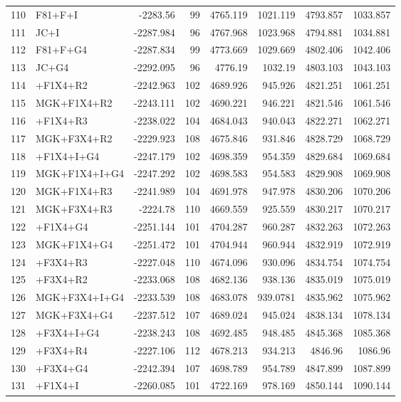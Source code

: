 \begin{longtable}{clrrrrrr}
	110 & F81+F+I & -2283.56 & 99 & 4765.119 & 1021.119 & 4793.857 & 1033.857 \\ 
	111 & JC+I & -2287.984 & 96 & 4767.968 & 1023.968 & 4794.881 & 1034.881 \\ 
	112 & F81+F+G4 & -2287.834 & 99 & 4773.669 & 1029.669 & 4802.406 & 1042.406 \\ 
	113 & JC+G4 & -2292.095 & 96 & 4776.19 & 1032.19 & 4803.103 & 1043.103 \\ 
	114 & \gy+F1X4+R2 & -2242.963 & 102 & 4689.926 & 945.926 & 4821.251 & 1061.251 \\ 
	115 & MGK+F1X4+R2 & -2243.111 & 102 & 4690.221 & 946.221 & 4821.546 & 1061.546 \\ 
	116 & \gy+F1X4+R3 & -2238.022 & 104 & 4684.043 & 940.043 & 4822.271 & 1062.271 \\ 
	117 & MGK+F3X4+R2 & -2229.923 & 108 & 4675.846 & 931.846 & 4828.729 & 1068.729 \\ 
	118 & \gy+F1X4+I+G4 & -2247.179 & 102 & 4698.359 & 954.359 & 4829.684 & 1069.684 \\ 
	119 & MGK+F1X4+I+G4 & -2247.292 & 102 & 4698.583 & 954.583 & 4829.908 & 1069.908 \\ 
	120 & MGK+F1X4+R3 & -2241.989 & 104 & 4691.978 & 947.978 & 4830.206 & 1070.206 \\ 
	121 & MGK+F3X4+R3 & -2224.78 & 110 & 4669.559 & 925.559 & 4830.217 & 1070.217 \\ 
	122 & \gy+F1X4+G4 & -2251.144 & 101 & 4704.287 & 960.287 & 4832.263 & 1072.263 \\ 
	123 & MGK+F1X4+G4 & -2251.472 & 101 & 4704.944 & 960.944 & 4832.919 & 1072.919 \\ 
	124 & \gy+F3X4+R3 & -2227.048 & 110 & 4674.096 & 930.096 & 4834.754 & 1074.754 \\ 
	125 & \gy+F3X4+R2 & -2233.068 & 108 & 4682.136 & 938.136 & 4835.019 & 1075.019 \\ 
	126 & MGK+F3X4+I+G4 & -2233.539 & 108 & 4683.078 & 939.0781 & 4835.962 & 1075.962 \\ 
	127 & MGK+F3X4+G4 & -2237.512 & 107 & 4689.024 & 945.024 & 4838.134 & 1078.134 \\ 
	128 & \gy+F3X4+I+G4 & -2238.243 & 108 & 4692.485 & 948.485 & 4845.368 & 1085.368 \\ 
	129 & \gy+F3X4+R4 & -2227.106 & 112 & 4678.213 & 934.213 & 4846.96 & 1086.96 \\ 
	130 & \gy+F3X4+G4 & -2242.394 & 107 & 4698.789 & 954.789 & 4847.899 & 1087.899 \\ 
	131 & \gy+F1X4+I & -2260.085 & 101 & 4722.169 & 978.169 & 4850.144 & 1090.144 \\ 

\end{longtable}
